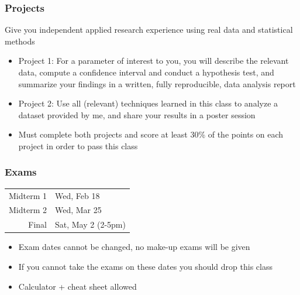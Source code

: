 \documentclass[slidestop,compress,mathserif,12pt,t,professionalfonts,xcolor=table]{beamer}
\begin{document}
\begin{frame}
\frametitle{Projects}

 Give you independent applied research experience using real data and statistical methods

\begin{itemize}

\item Project 1: For a parameter of interest to you, you will describe the relevant data, compute a confidence interval and conduct a hypothesis test, and summarize your findings in a written, fully reproducible, data analysis report

\item Project 2: Use all (relevant) techniques learned in this class to analyze a dataset provided by me, and share your results in a poster session

\item Must complete both projects and score at least 30\% of the points on each project in order to pass this class

\end{itemize}

\end{frame}


\begin{frame}
\frametitle{Exams}

\begin{center}
\renewcommand\arraystretch{1.25}
{\footnotesize
\begin{tabular}{ r | l }
Midterm 1								& Wed, Feb 18 \\    
Midterm 2 							& Wed, Mar 25 \\    
Final 								& Sat, May 2 (2-5pm)     
\end{tabular}
}
\end{center}

\begin{itemize}

\item Exam dates cannot be changed, no make-up exams will be given

\item If you cannot take the exams on these dates you should drop this class

\item Calculator + cheat sheet allowed

\end{itemize}

\end{frame}
\end{document}
